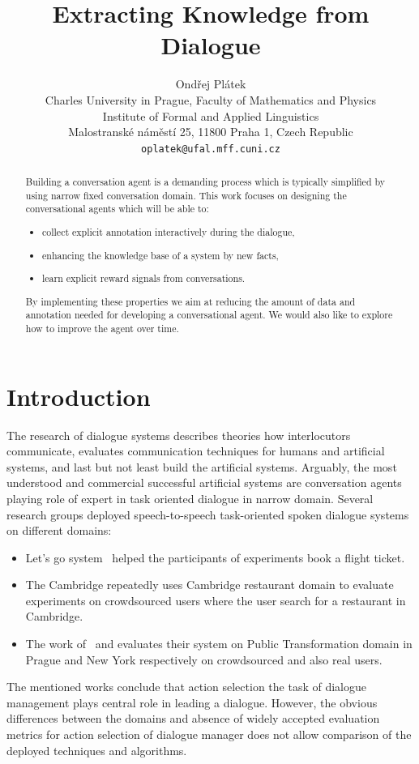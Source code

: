 \documentclass[11pt]{article}
\title{Extracting Knowledge from Dialogue}
\author{Ondřej Plátek \\
  Charles University in Prague, Faculty of Mathematics and Physics \\
  Institute of Formal and Applied Linguistics \\
  Malostranské náměstí 25, 11800 Praha 1, Czech Republic\\
  {\tt oplatek@ufal.mff.cuni.cz}\\}
\date{}
\begin{document}
\maketitle
\begin{abstract}
Building a conversation agent is a demanding process which is typically simplified by using narrow fixed conversation domain.
This work focuses on designing the conversational agents which will be able to:
\begin{itemize}
    \item collect explicit annotation interactively during the dialogue,
    \item enhancing the knowledge base of a system by new facts,
    \item learn explicit reward signals from conversations.
\end{itemize}
By implementing these properties we aim at reducing the amount of data and annotation needed for developing a conversational agent.
We would also like to explore how to improve the agent over time.
\end{abstract}

\section{Introduction}
\label{sec:introduction}
The research of dialogue systems describes theories how interlocutors communicate, evaluates communication techniques for humans and artificial systems, and last but not least build the artificial systems.
Arguably, the most understood and commercial successful artificial systems are conversation agents playing role of expert in task oriented dialogue in narrow domain.
Several research groups deployed speech-to-speech task-oriented spoken dialogue systems on different domains:

\begin{itemize}
    \item Let's go system~\cite{raux_lets_2005} helped the participants of experiments book a flight ticket.
    \item The Cambridge repeatedly uses Cambridge restaurant domain to evaluate experiments on crowdsourced users where the user search for a restaurant in Cambridge.
    \item The work of~\cite{dusek_sequence2sequence_2016} and \cite{vejman_martin_development_2015} evaluates their system on Public Transformation domain in Prague and New York respectively on crowdsourced and also real users. 
\end{itemize}
The mentioned works conclude that action selection the task of dialogue management plays central role in leading a dialogue.
However, the obvious differences between the domains and absence of widely accepted evaluation metrics for action selection of dialogue manager does not allow comparison of the deployed techniques and algorithms.
\end{document}
